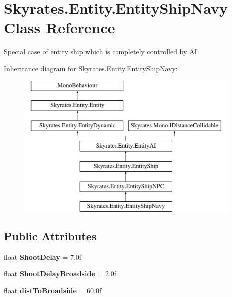 \hypertarget{class_skyrates_1_1_entity_1_1_entity_ship_navy}{\section{Skyrates.\-Entity.\-Entity\-Ship\-Navy Class Reference}
\label{class_skyrates_1_1_entity_1_1_entity_ship_navy}
}


Special case of entity ship which is completely controlled by \hyperlink{namespace_skyrates_1_1_a_i}{A\-I}.  


Inheritance diagram for Skyrates.\-Entity.\-Entity\-Ship\-Navy\-:\begin{figure}[H]
\begin{center}
\leavevmode
\includegraphics[height=7.000000cm]{class_skyrates_1_1_entity_1_1_entity_ship_navy}
\end{center}
\end{figure}
\subsection*{Public Attributes}
\begin{DoxyCompactItemize}
\item 
\hypertarget{class_skyrates_1_1_entity_1_1_entity_ship_navy_a00ec5631b84ca3e7565faeabb4d78298}{float {\bfseries Shoot\-Delay} = 7.\-0f}\label{class_skyrates_1_1_entity_1_1_entity_ship_navy_a00ec5631b84ca3e7565faeabb4d78298}

\item 
\hypertarget{class_skyrates_1_1_entity_1_1_entity_ship_navy_a58a59eebfa89639741c0396a38e80d15}{float {\bfseries Shoot\-Delay\-Broadside} = 2.\-0f}\label{class_skyrates_1_1_entity_1_1_entity_ship_navy_a58a59eebfa89639741c0396a38e80d15}

\item 
\hypertarget{class_skyrates_1_1_entity_1_1_entity_ship_navy_a536b541bbddd1981413f668be92532df}{float {\bfseries dist\-To\-Broadside} = 60.\-0f}\label{class_skyrates_1_1_entity_1_1_entity_ship_navy_a536b541bbddd1981413f668be92532df}

\end{DoxyCompactItemize}
